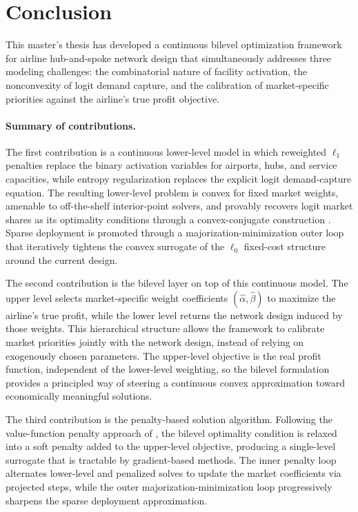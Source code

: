 \section{Conclusion}

This master's thesis has developed a continuous bilevel optimization framework for airline hub-and-spoke network design that simultaneously addresses three modeling challenges: the combinatorial nature of facility activation, the nonconvexity of logit demand capture, and the calibration of market-specific priorities against the airline's true profit objective.

\paragraph{Summary of contributions.}
The first contribution is a continuous lower-level model in which reweighted $\ell_1$ penalties replace the binary activation variables for airports, hubs, and service capacities, while entropy regularization replaces the explicit logit demand-capture equation. The resulting lower-level problem is convex for fixed market weights, amenable to off-the-shelf interior-point solvers, and provably recovers logit market shares as its optimality conditions through a convex-conjugate construction \cite{Oppenheim1993,RealRojas2026TRB}. Sparse deployment is promoted through a majorization-minimization outer loop that iteratively tightens the convex surrogate of the $\ell_0$ fixed-cost structure around the current design.

The second contribution is the bilevel layer on top of this continuous model. The upper level selects market-specific weight coefficients $(\widehat{\alpha},\widehat{\beta})$ to maximize the airline's true profit, while the lower level returns the network design induced by those weights. This hierarchical structure allows the framework to calibrate market priorities jointly with the network design, instead of relying on exogenously chosen parameters. The upper-level objective is the real profit function, independent of the lower-level weighting, so the bilevel formulation provides a principled way of steering a continuous convex approximation toward economically meaningful solutions.

The third contribution is the penalty-based solution algorithm. Following the value-function penalty approach of \cite{Ye1997Exact,Jiang2024Primal}, the bilevel optimality condition is relaxed into a soft penalty added to the upper-level objective, producing a single-level surrogate that is tractable by gradient-based methods. The inner penalty loop alternates lower-level and penalized solves to update the market coefficients via projected steps, while the outer majorization-minimization loop progressively sharpens the sparse deployment approximation.

